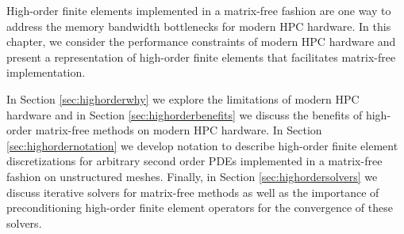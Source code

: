 High-order finite elements implemented in a matrix-free fashion are one way to address the memory bandwidth bottlenecks for modern HPC hardware.
In this chapter, we consider the performance constraints of modern HPC hardware and present a representation of high-order finite elements that facilitates matrix-free implementation.

In Section \ref{sec:highorderwhy} we explore the limitations of modern HPC hardware and in Section \ref{sec:highorderbenefits} we discuss the benefits of high-order matrix-free methods on modern HPC hardware.
In Section \ref{sec:highordernotation} we develop notation to describe high-order finite element discretizations for arbitrary second order PDEs implemented in a matrix-free fashion on unstructured meshes.
Finally, in Section \ref{sec:highordersolvers} we discuss iterative solvers for matrix-free methods as well as the importance of preconditioning high-order finite element operators for the convergence of these solvers.
